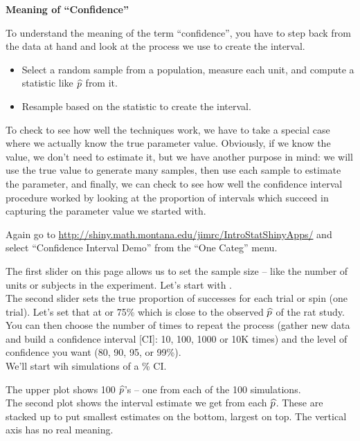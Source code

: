 \begin{center}
  {\Large\bf Meaning of ``Confidence''}
\end{center}

To understand the meaning of the term ``confidence'', you have to step
back from the data at hand and look at the process we use to create
the interval.
\begin{itemize}
  \item Select a random sample from a population, measure each unit,
    and compute a  statistic like $\widehat{p}$ from it.
  \item Resample based on the statistic to create the interval.
  \end{itemize}

To check to see how well the techniques work, we have to take a
 special case where we actually know the true parameter value.
 Obviously, if we know the value, we don't need to estimate it, but we
 have another purpose in mind: we will use the true value to generate
 many samples, then use each sample to estimate the parameter, and
 finally, we can check to see how well the confidence interval
 procedure worked by looking at the proportion of intervals which
 succeed in capturing the parameter value we started with.

 Again go to \url{http://shiny.math.montana.edu/jimrc/IntroStatShinyApps/}
 and select ``Confidence Interval Demo'' from the ``One Categ'' menu.
 
 The first slider on this page allows us to set the sample size --
 like the number of units or subjects in the experiment.  Let's start with
 .\\
 The second slider sets the true proportion of successes for each
 trial or spin (one trial).  Let's set that at  or 75\%
 which is close to the observed $\widehat{p}$ of the rat study.\\
 You can then choose the number of times to repeat the process (gather
 new data and build a confidence interval [CI]: 10, 100, 1000 or 10K
 times) and the level of confidence you want (80, 90, 95, or 99\%).\\
 We'll start wih  simulations of a \% CI.

  The upper plot shows 100  $\widehat{p}$'s -- one from each of the 100 simulations.
  \\
  The second plot shows the interval estimate we get from each
  $\widehat{p}$.  These  are stacked up to put smallest estimates on the
  bottom, largest on top. The vertical axis has no real meaning. 

